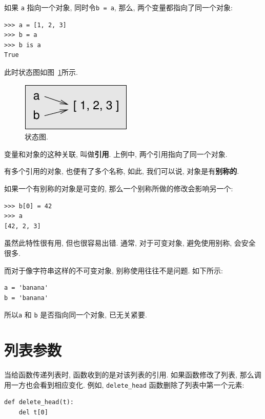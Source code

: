 \documentclass[10pt]{book}
\begin{document}
如果 {\tt a} 指向一个对象, 同时令{\tt b = a},
那么, 两个变量都指向了同一个对象:

\begin{verbatim}
>>> a = [1, 2, 3]
>>> b = a
>>> b is a
True
\end{verbatim}
%
此时状态图如图~\ref{fig.list3}所示.

\begin{figure}
\centerline
{\includegraphics[scale=0.8]{figs/list3.pdf}}
\caption{状态图.}
\label{fig.list3}
\end{figure}

变量和对象的这种关联, 叫做{\bf 引用}.
上例中, 两个引用指向了同一个对象. 

有多个引用的对象, 也便有了多个名称, 
如此, 我们可以说, 对象是有{\bf 别称的}.

如果一个有别称的对象是可变的, 那么一个别称所做的修改会影响另一个:

\begin{verbatim}
>>> b[0] = 42
>>> a
[42, 2, 3]
\end{verbatim}
%

虽然此特性很有用, 但也很容易出错. 
通常, 对于可变对象, 避免使用别称, 会安全很多. 

而对于像字符串这样的不可变对象, 别称使用往往不是问题. 
如下所示:

\begin{verbatim}
a = 'banana'
b = 'banana'
\end{verbatim}
%
所以{\tt a} 和 {\tt b} 是否指向同一个对象, 已无关紧要. 


\section{列表参数}
\label{list.arguments}

当给函数传递列表时, 函数收到的是对该列表的引用. 
如果函数修改了列表, 那么调用一方也会看到相应变化. 
例如, \verb"delete_head" 函数删除了列表中第一个元素:

\begin{verbatim}
def delete_head(t):
    del t[0]
\end{verbatim}
%
\end{document}
